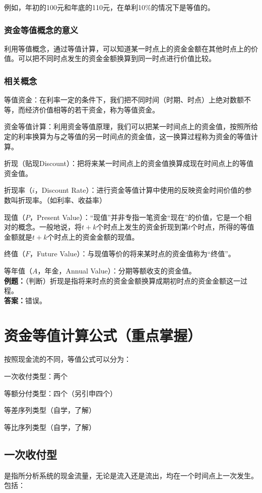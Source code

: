例如，年初的100元和年底的110元，在单利10\%的情况下是等值的。

\subsubsection{资金等值概念的意义}
利用等值概念，通过等值计算，可以知道某一时点上的资金金额在其他时点上的价值。可以把不同时点发生的资金金额换算到同一时点进行价值比较。
\subsubsection{相关概念}
等值资金：在利率一定的条件下，我们把不同时间（时期、时点）上绝对数额不等，而经济价值相等的若干资金，称为等值资金。

资金等值计算：利用资金等值原理，我们可以把某一时间点上的资金值，按照所给定的利率换算为与之等值的另一时间点的资金值，这一换算过程称为资金的等值计算。

折现（贴现Discount）：把将来某一时间点上的资金值换算成现在时间点上的等值资金值。

折现率（$i$，Discount Rate）：进行资金等值计算中使用的反映资金时间价值的参数叫折现率。（如利率、收益率）

现值（$P$，Present Value）：“现值”并非专指一笔资金“现在”的价值，它是一个相对的概念。一般地说，将$t+k$个时点上发生的资金折现到第$t$个时点，所得的等值金额就是$t+k$个时点上的资金金额的现值。

终值（$F$，Future Value）：与现值等价的将来某时点的资金值称为“终值”。

等年值（$A$，年金，Annual Value）：分期等额收支的资金值。\\
\textbf{例题：}（判断）折现是指将来时点的资金金额换算成期初时点的资金金额这一过程。\\
\textbf{答案：}错误。

\section{资金等值计算公式（重点掌握）}
按照现金流的不同，等值公式可以分为：

一次收付类型：两个

等额分付类型：四个（另引申四个）

等差序列类型（自学，了解）

等比序列类型（自学，了解）

\subsection{一次收付型}
是指所分析系统的现金流量，无论是流入还是流出，均在一个时间点上一次发生。包括：

